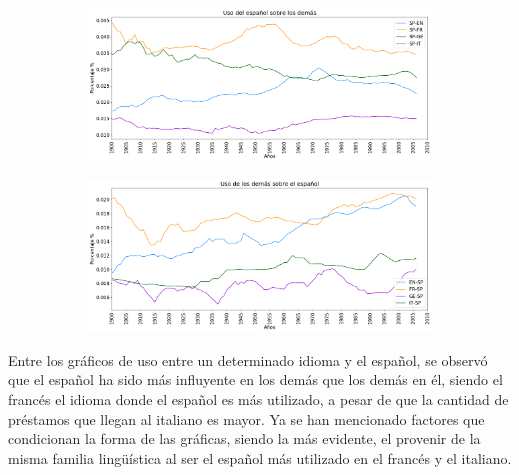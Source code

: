 \begin{figure}[h!]
	
	\begin{subfigure}{}
		\centering
		\includegraphics[scale=.38]{Cap_4/PF1_S2_SP.png}
		\caption{}
		\label{fig:ST_SP_a}
	\end{subfigure}
	
	\begin{subfigure}{}
		\centering
		\includegraphics[scale=.38]{Cap_4/PF2_S2_SP.png}
		\caption{}
		\label{fig:ST_SP_b}
	\end{subfigure}
	
\end{figure}


Entre los gráficos de uso entre un determinado idioma y el español, se observó que el español ha sido más influyente en los demás que los demás en él,  siendo el francés el idioma donde el español es más utilizado, a pesar de que la cantidad de préstamos que llegan al italiano es mayor.   Ya se han mencionado factores que condicionan la forma de las gráficas, siendo la más evidente, el provenir de la misma familia lingüística al ser el español más utilizado en el francés y el italiano. 

